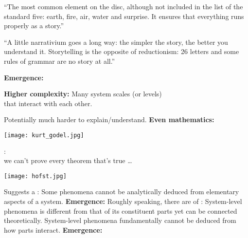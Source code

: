         
         
          ``The most common element on the disc, although not
          included in the list of the standard five: earth, fire, air,
          water and surprise. It ensures that everything runs properly
          as a story.''
        
          ``A little narrativium goes a long way: the simpler the story,
          the better you understand it. Storytelling is the opposite of
          reductionism: 26 letters and some rules of grammar are no story
          at all.''
    

  \textbf{Emergence:}

  \textbf{Higher complexity:}
      Many system scales (or levels) \\ 
      that
      interact with each other.
    
      Potentially much harder to explain/understand.
  \textbf{Even mathematics:\cite{foote2007a}}
      
      
\begin{marginfigure}[]
\texttt{[image: kurt\_godel.jpg]}
\end{marginfigure}

      
      :\\
      we can't prove every theorem that's true \ldots

      \begin{marginfigure}[]
        \texttt{[image: hofst.jpg]}
 \end{marginfigure}

  
      Suggests a :
      {
        Some phenomena cannot be analytically deduced
        from elementary aspects of a system.
      }
  \textbf{Emergence:}
    Roughly speaking, there are  of :  
  \textbf{}
    System-level phenomena is
    different from that of its constituent parts
    yet can be connected theoretically.
  \textbf{}
    System-level 
    phenomena fundamentally cannot
    be deduced from how parts interact.
  \textbf{Emergence:}
    
